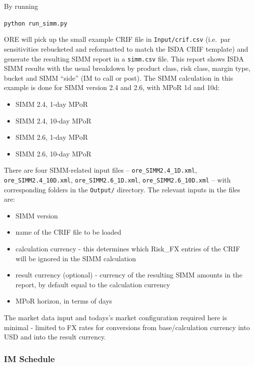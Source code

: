 By running \\
\medskip
\centerline{{\tt python run\_simm.py}}

\medskip
ORE will pick up the small example CRIF file in {\tt Input/crif.csv} (i.e.\ par sensitivities rebucketed and reformatted to match the ISDA CRIF template) and generate the resulting SIMM report in a {\tt simm.csv} file.
This report shows ISDA SIMM results with the usual breakdown by product class, risk class, margin type, bucket and SIMM ``side'' (IM to call or post).
The SIMM calculation in this example is done for SIMM version 2.4 and 2.6, with MPoR 1d and 10d:

\begin{itemize}
  \item SIMM 2.4, 1-day MPoR
  \item SIMM 2.4, 10-day MPoR
  \item SIMM 2.6, 1-day MPoR
  \item SIMM 2.6, 10-day MPoR
\end{itemize}

\medskip
There are four SIMM-related input files -- {\tt ore\_SIMM2.4\_1D.xml}, {\tt ore\_SIMM2.4\_10D.xml}, {\tt ore\_SIMM2.6\_1D.xml}, {\tt ore\_SIMM2.6\_10D.xml} -- with corresponding folders in the {\tt Output/} directory.
The relevant inputs in the files are:

\begin{itemize}
\item SIMM version
\item name of the CRIF file to be loaded
\item calculation currency - this determines which Risk\_FX entries of the CRIF will be ignored in the SIMM calculation
\item result currency (optional) - currency of the resulting SIMM amounts in the report, by default equal to the calculation currency
\item MPoR horizon, in terms of days
\end{itemize}

The market data input and todays's market configuration required here is minimal - limited to FX rates for conversions from base/calculation currency into USD and into the result currency.



\subsubsection*{IM Schedule}

